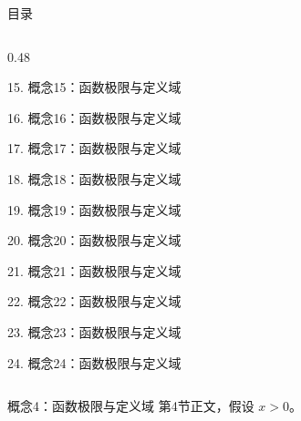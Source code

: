 \documentclass[aspectratio=169,10pt,fontset=fandol]{ctexbeamer}
\begin{document}
\begin{frame}[t,fragile]{目录}
\begin{columns}[T,onlytextwidth]
\begin{column}{0.48\textwidth}
{\color{gray!40}\small 15. 概念15：函数极限与定义域\par}\vspace{0.22em}
{\color{gray!40}\small 16. 概念16：函数极限与定义域\par}\vspace{0.22em}
{\color{gray!40}\small 17. 概念17：函数极限与定义域\par}\vspace{0.22em}
{\color{gray!40}\small 18. 概念18：函数极限与定义域\par}\vspace{0.22em}
{\color{gray!40}\small 19. 概念19：函数极限与定义域\par}\vspace{0.22em}
{\color{gray!40}\small 20. 概念20：函数极限与定义域\par}\vspace{0.22em}
{\color{gray!40}\small 21. 概念21：函数极限与定义域\par}\vspace{0.22em}
{\color{gray!40}\small 22. 概念22：函数极限与定义域\par}\vspace{0.22em}
{\color{gray!40}\small 23. 概念23：函数极限与定义域\par}\vspace{0.22em}
{\color{gray!40}\small 24. 概念24：函数极限与定义域\par}\vspace{0.22em}
\end{column}
\end{columns}
\end{frame}
\begin{frame}[t,fragile]{概念4：函数极限与定义域}
\normalsize
{\normalsize
第4节正文，假设 $x>0$。
}
\end{frame}
\end{document}
